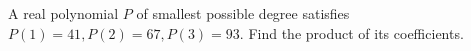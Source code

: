 A real polynomial $P$ of smallest possible degree satisfies $P(1)=41,P(2)=67,P(3)=93$. Find the product of its coefficients.
